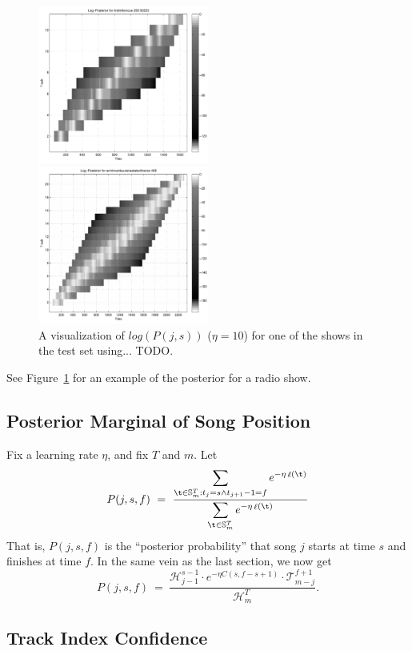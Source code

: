 \documentclass[twocolumn]{article}
\DeclareMathOperator{\loss}{\ell}
\newcommand{\segs}{\mathbb S}
\newcommand{\head}{\mathcal H}
\newcommand{\tail}{\mathcal T}
\begin{document}
\begin{figure}
	\centering
	\includegraphics[width=0.5\textwidth]{images/posterior2}

	\bigskip

	\includegraphics[width=0.5\textwidth]{images/posterior3}
	\caption{A visualization of $log(P(j,s))$ ($\eta=10$) for one of the shows in the test set using... TODO.}
	\label{fig:posterior3}
\end{figure} 

See Figure~\ref{fig:posterior3} for an example of the posterior for a radio show. 

\subsection{Posterior Marginal of Song Position}
Fix a learning rate $\eta$, and fix $T$ and $m$. Let
\[
P(j,s,f) ~=~ 
\frac{\displaystyle
	\sum_{\t \in \segs^T_m : t_j = s \land t_{j+1}-1 = f} e^{- \eta \loss(\t)}
}{\displaystyle
\sum_{\t \in \segs^T_m} e^{- \eta \loss(\t)}
}
\]
That is, $P(j,s,f)$ is the ``posterior probability'' that song $j$ starts at time $s$ and finishes at time $f$.
%
In the same vein as the last section, we now get
\[
P(j,s,f) ~=~ \frac{\head^{s-1}_{j-1} \cdot e^{-\eta C(s, f-s+1)} \cdot \tail^{f+1}_{m-j}}{\head^T_m}.
\]


\subsection{Track Index Confidence}
\end{document}
